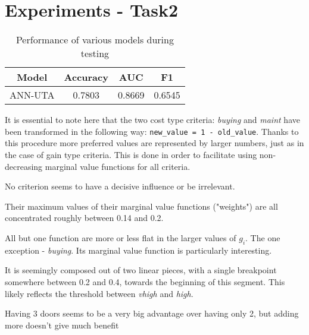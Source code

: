 \documentclass[../main.tex]{subfiles}
\begin{document}
\section{Experiments - Task2}

\begin{table}
    \begin{center}
        \begin{tabular}{c||c|c|c}
            \hline
            Model & Accuracy & AUC & F1 \\
            \hline
            \hline
            ANN-UTA & 0.7803 & 0.8669 & 0.6545
        \end{tabular}
        \caption{Performance of various models during testing}
    \end{center}
\end{table}

It is essential to note here that the two cost type criteria: \emph{buying} and \emph{maint}
have been transformed in the following way:
\verb|new_value = 1 - old_value|.
Thanks to this procedure more preferred values are represented by larger numbers,
just as in the case of gain type criteria.
This is done in order to facilitate using non-decreasing marginal value functions for all criteria.

No criterion seems to have a decisive influence or be irrelevant.

Their maximum values of their marginal value functions ("weights")
are all concentrated roughly between 0.14 and 0.2.

All but one function are more or less flat in the larger values of $g_i$.
The one exception - \emph{buying}. Its marginal value function is particularly interesting.

It is seemingly composed out of two linear pieces, with a single breakpoint
somewhere between 0.2 and 0.4, towards the beginning of this segment.
This likely reflects the threshold between \emph{vhigh} and \emph{high}.

Having 3 doors seems to be a very big advantage over having only 2,
but adding more doesn't give much benefit
\end{document}

